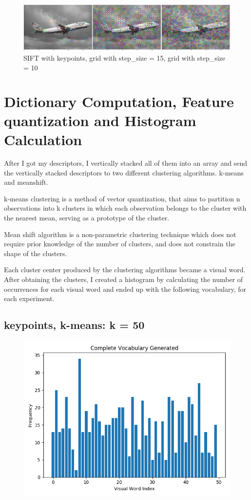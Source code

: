 \begin{figure}[H]
    \centering
    \includegraphics[width=\textwidth]{images/ext-desc.png}
    \caption*{SIFT with keypoints, grid with step\_size = 15, grid with step\_size = 10}
    \setlength{\belowcaptionskip}{-20pt}
    \setlength{\abovecaptionskip}{-20pt}
\end{figure}


\section*{Dictionary Computation, Feature quantization and Histogram Calculation}

After I got my descriptors, I vertically stacked all of them into an array and
send the vertically stacked descriptors to two different clustering algorithms.
k-means and meanshift.

k-means clustering is a method of vector quantization, that aims to partition n
observations into k clusters in which each observation belongs to the cluster
with the nearest mean, serving as a prototype of the cluster.

Mean shift algorithm is a non-parametric clustering technique which does not
require prior knowledge of the number of clusters, and does not constrain the
shape of the clusters.

Each cluster center produced by the clustering algorithms became a visual word.
After obtaining the clusters, I created a histogram by calculating the number of
occurrences for each visual word and ended up with the following vocabulary, for
each experiment.

\subsection*{keypoints, k-means: k = 50}
\begin{figure}[H]
    \centering
    \includegraphics[scale = 0.5]{images/bow-kp-50.png}
\end{figure}


